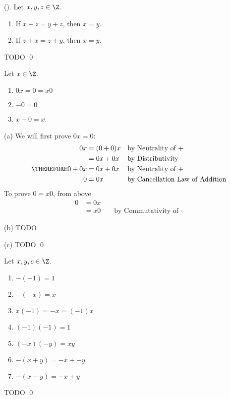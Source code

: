 \begin{prop}
\label{prop:Z-cancellation-law-for-addition}
  \textnormal{()}.
  Let $x, y, z \in \Z$.
  \begin{enumerate}[nosep,label=\textnormal{(\alph*)}]
    \item If $x + z = y + z$, then $x = y$.
    \item If $z + x = z + y$, then $x = y$.
  \end{enumerate}
\end{prop}
\proof
TODO
\qed

\begin{prop}
\label{prop:Z-properties-of-zero}
  Let $x \in \Z$.
  \begin{enumerate}[nosep,label=\textnormal{(\alph*)}]
  \item $0x = 0 = x0$
  \item $-0 = 0$
  \item $x - 0 = x$. 
  \end{enumerate}
\end{prop}
\proof
(a) 
We will first prove $0x = 0$:
\begin{align*}
  0x &= (0 + 0)x     & & \text{by Neutrality of $+$} \\
     &= 0x + 0x      & & \text{by Distributivity} \\
\THEREFORE  0 + 0x &= 0x + 0x  & & \text{by Neutrality of $+$} \\
  0  &= 0x       & & \text{by Cancellation Law of Addition} 
\end{align*}
To prove $0 = x0$, from above
\begin{align*}
  0 &= 0x \\
    &= x0 & & \text{ by Commutativity of $\cdot$}
\end{align*}

(b)
TODO

(c)
TODO
\qed

\begin{prop}
\label{prop:Z-properties-of-negative}
  Let $x, y, c \in \Z$.
  \begin{enumerate}[nosep,label=\textnormal{(\alph*)}]
  \item $-(-1) = 1$
  \item $-(-x) = x$
  \item $x(-1) = -x = (-1)x$
  \item $(-1)(-1) = 1$
  \item $(-x)(-y) = xy$
  \item $-(x + y) = -x + -y$
  \item $-(x - y) = -x + y$
  \end{enumerate}
\end{prop}
\proof
TODO
\qed

